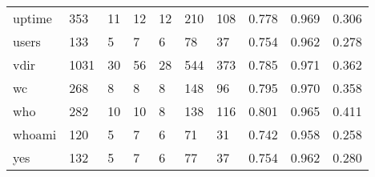 \begin{longtable}{lp{1.3cm}p{1.3cm}p{1.3cm}p{1.3cm}p{1.3cm}p{1.3cm}p{1.3cm}p{1.3cm}p{1.3cm}}
uptime    &                    353 &                                 11 &                                12 &                               12 &                               210 &                             108 &                                   0.778 &                                  0.969 &                                0.306 \\
users     &                    133 &                                  5 &                                 7 &                                6 &                                78 &                              37 &                                   0.754 &                                  0.962 &                                0.278 \\
vdir      &                   1031 &                                 30 &                                56 &                               28 &                               544 &                             373 &                                   0.785 &                                  0.971 &                                0.362 \\
wc        &                    268 &                                  8 &                                 8 &                                8 &                               148 &                              96 &                                   0.795 &                                  0.970 &                                0.358 \\
who       &                    282 &                                 10 &                                10 &                                8 &                               138 &                             116 &                                   0.801 &                                  0.965 &                                0.411 \\
whoami    &                    120 &                                  5 &                                 7 &                                6 &                                71 &                              31 &                                   0.742 &                                  0.958 &                                0.258 \\
yes       &                    132 &                                  5 &                                 7 &                                6 &                                77 &                              37 &                                   0.754 &                                  0.962 &                                0.280 \\
\end{longtable}

